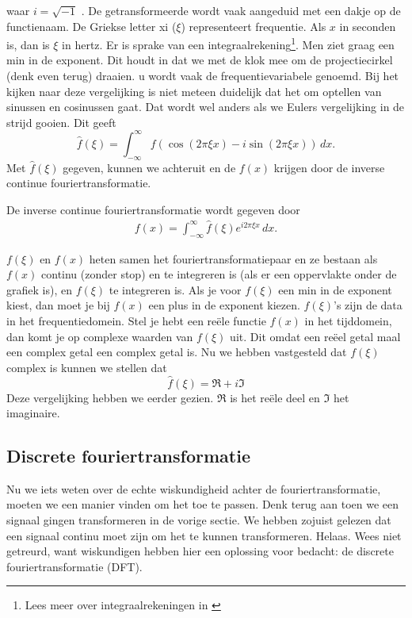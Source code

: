 \documentclass[11pt,fleqn]{book} %
\begin{document}
waar $i = \sqrt{-1}$ \cite{yy}. De getransformeerde wordt vaak aangeduid met een dakje op de functienaam. De Griekse letter xi ($\xi$) representeert frequentie. Als $x$ in seconden is, dan is $\xi$ in hertz. Er is sprake van een integraalrekening\footnote{Lees meer over integraalrekeningen in \cite{int}}. Men ziet graag een min in de exponent. Dit houdt in dat we met de klok mee om de projectiecirkel (denk even terug) draaien. u wordt vaak de frequentievariabele genoemd. Bij het kijken naar deze vergelijking is niet meteen duidelijk dat het om optellen van sinussen en cosinussen gaat. Dat wordt wel anders als we Eulers vergelijking in de strijd gooien. Dit geeft
\begin{equation*}
\hat{f}(\xi)=\int_{-\infty}^\infty f(\cos{(2\pi \xi x)}-i\sin{(2\pi \xi x)})\, dx.
\end{equation*}
Met $\hat{f}(\xi)$ gegeven, kunnen we achteruit en de $f(x)$ krijgen door de inverse continue fouriertransformatie.
\begin{definition} \label{eq:icf}
De inverse continue fouriertransformatie wordt gegeven door
\begin{align}
f(x)=\int_{-\infty}^\infty \hat{f}(\xi)e^{i2\pi \xi x} \, dx.
\end{align}
\end{definition}

$f(\xi)$ en $f(x)$ heten samen het fouriertransformatiepaar en ze bestaan als $f(x)$ continu (zonder stop) en te integreren is (als er een oppervlakte onder de grafiek is), en $f(\xi)$ te integreren is. Als je voor $f(\xi)$ een min in de exponent kiest, dan moet je bij $f(x)$ een plus in de exponent kiezen.
$f(\xi)$'s zijn de data in het frequentiedomein. Stel je hebt een reële functie $f(x)$ in het tijddomein, dan komt je op complexe waarden van $f(\xi)$ uit. Dit omdat een reëel getal maal een complex getal een complex getal is. Nu we hebben vastgesteld dat $f(\xi)$ complex is kunnen we stellen dat
\begin{equation*}
\hat{f}(\xi)=\Re + i\Im
\end{equation*}
Deze vergelijking hebben we eerder gezien. $\Re$ is het reële deel en $\Im$ het imaginaire.

\subsection{Discrete fouriertransformatie}
Nu we iets weten over de echte wiskundigheid achter de fouriertransformatie, moeten we een manier vinden om het toe te passen. Denk terug aan toen we een signaal gingen transformeren in de vorige sectie. We hebben zojuist gelezen dat een signaal continu moet zijn om het te kunnen transformeren. Helaas. Wees niet getreurd, want wiskundigen hebben hier een oplossing voor bedacht: de discrete fouriertransformatie (DFT).
\end{document}

